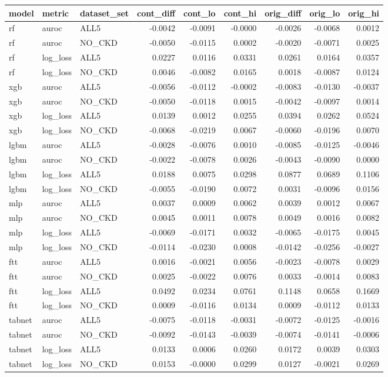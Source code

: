 \begin{tabular}{lllrrrrrr}
\toprule
model & metric & dataset\_set & cont\_diff & cont\_lo & cont\_hi & orig\_diff & orig\_lo & orig\_hi \\
\midrule
rf & auroc & ALL5 & -0.0042 & -0.0091 & -0.0000 & -0.0026 & -0.0068 & 0.0012 \\
rf & auroc & NO\_CKD & -0.0050 & -0.0115 & 0.0002 & -0.0020 & -0.0071 & 0.0025 \\
rf & log\_loss & ALL5 & 0.0227 & 0.0116 & 0.0331 & 0.0261 & 0.0164 & 0.0357 \\
rf & log\_loss & NO\_CKD & 0.0046 & -0.0082 & 0.0165 & 0.0018 & -0.0087 & 0.0124 \\
xgb & auroc & ALL5 & -0.0056 & -0.0112 & -0.0002 & -0.0083 & -0.0130 & -0.0037 \\
xgb & auroc & NO\_CKD & -0.0050 & -0.0118 & 0.0015 & -0.0042 & -0.0097 & 0.0014 \\
xgb & log\_loss & ALL5 & 0.0139 & 0.0012 & 0.0255 & 0.0394 & 0.0262 & 0.0524 \\
xgb & log\_loss & NO\_CKD & -0.0068 & -0.0219 & 0.0067 & -0.0060 & -0.0196 & 0.0070 \\
lgbm & auroc & ALL5 & -0.0028 & -0.0076 & 0.0010 & -0.0085 & -0.0125 & -0.0046 \\
lgbm & auroc & NO\_CKD & -0.0022 & -0.0078 & 0.0026 & -0.0043 & -0.0090 & 0.0000 \\
lgbm & log\_loss & ALL5 & 0.0188 & 0.0075 & 0.0298 & 0.0877 & 0.0689 & 0.1106 \\
lgbm & log\_loss & NO\_CKD & -0.0055 & -0.0190 & 0.0072 & 0.0031 & -0.0096 & 0.0156 \\
mlp & auroc & ALL5 & 0.0037 & 0.0009 & 0.0062 & 0.0039 & 0.0012 & 0.0067 \\
mlp & auroc & NO\_CKD & 0.0045 & 0.0011 & 0.0078 & 0.0049 & 0.0016 & 0.0082 \\
mlp & log\_loss & ALL5 & -0.0069 & -0.0171 & 0.0032 & -0.0065 & -0.0175 & 0.0045 \\
mlp & log\_loss & NO\_CKD & -0.0114 & -0.0230 & 0.0008 & -0.0142 & -0.0256 & -0.0027 \\
ftt & auroc & ALL5 & 0.0016 & -0.0021 & 0.0056 & -0.0023 & -0.0078 & 0.0029 \\
ftt & auroc & NO\_CKD & 0.0025 & -0.0022 & 0.0076 & 0.0033 & -0.0014 & 0.0083 \\
ftt & log\_loss & ALL5 & 0.0492 & 0.0234 & 0.0761 & 0.1148 & 0.0658 & 0.1669 \\
ftt & log\_loss & NO\_CKD & 0.0009 & -0.0116 & 0.0134 & 0.0009 & -0.0112 & 0.0133 \\
tabnet & auroc & ALL5 & -0.0075 & -0.0118 & -0.0031 & -0.0072 & -0.0125 & -0.0016 \\
tabnet & auroc & NO\_CKD & -0.0092 & -0.0143 & -0.0039 & -0.0074 & -0.0141 & -0.0006 \\
tabnet & log\_loss & ALL5 & 0.0133 & 0.0006 & 0.0260 & 0.0172 & 0.0039 & 0.0303 \\
tabnet & log\_loss & NO\_CKD & 0.0153 & -0.0000 & 0.0299 & 0.0127 & -0.0021 & 0.0269 \\
\bottomrule
\end{tabular}
